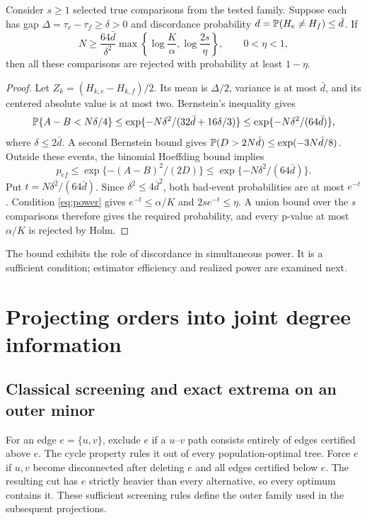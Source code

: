 \documentclass[11pt]{article}
\theoremstyle{plain}
\theoremstyle{definition}\newtheorem{remark}{Remark}\newtheorem{example}{Example}
\begin{document}
\begin{proposition}\label{prop:power}
Consider $s\ge1$ selected true comparisons from the tested family. Suppose each has gap $\Delta=\tau_e-\tau_f\ge\delta>0$ and discordance probability $d=\mathbb P(H_e\ne H_f)\le\bar d$. If
\begin{equation}\label{eq:power}
 N\ge\frac{64\bar d}{\delta^2}\max\left\{\log\frac K\alpha,\log\frac{2s}\eta\right\},\qquad 0<\eta<1,
\end{equation}
then all these comparisons are rejected with probability at least $1-\eta$.
\end{proposition}
\begin{proof}
Let $Z_k=(H_{k,e}-H_{k,f})/2$. Its mean is $\Delta/2$, variance is at most $\bar d$, and its centered absolute value is at most two. Bernstein's inequality gives
\[
 \mathbb P\{A-B<N\delta/4\}
 \le \exp\{-N\delta^2/(32\bar d+16\delta/3)\}
 \le \exp\{-N\delta^2/(64\bar d)\},
\]
where $\delta\le2\bar d$. A second Bernstein bound gives $\mathbb P(D>2N\bar d)\le\exp(-3N\bar d/8)$. Outside these events, the binomial Hoeffding bound implies
\[
 p_{ef}\le\exp\{-(A-B)^2/(2D)\}\le\exp\{-N\delta^2/(64\bar d)\}.
\]
Put $t=N\delta^2/(64\bar d)$. Since $\delta^2\le4\bar d^2$, both bad-event probabilities are at most $e^{-t}$. Condition \eqref{eq:power} gives $e^{-t}\le\alpha/K$ and $2s e^{-t}\le\eta$. A union bound over the $s$ comparisons therefore gives the required probability, and every p-value at most $\alpha/K$ is rejected by Holm.
\end{proof}

The bound exhibits the role of discordance in simultaneous power. It is a sufficient condition; estimator efficiency and realized power are examined next.




\section{Projecting orders into joint degree information}\label{sec:minor}
\subsection{Classical screening and exact extrema on an outer minor}
For an edge $e=\{u,v\}$, exclude $e$ if a $u$--$v$ path consists entirely of edges certified above $e$. The cycle property rules it out of every population-optimal tree. Force $e$ if $u,v$ become disconnected after deleting $e$ and all edges certified below $e$. The resulting cut has $e$ strictly heavier than every alternative, so every optimum contains it. These sufficient screening rules define the outer family used in the subsequent projections.
\end{document}
